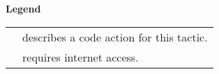 \documentclass[a4paper]{article}
\newcommand{\light}{\faLightbulbO\xspace}
\newcommand{\internet}{\faGlobe\xspace}
\begin{document}
\textbf{Legend}\\
\begin{tabular}{ll}
\light & describes a code action for this tactic.\\
\internet & requires internet access.\\
\end{tabular}
\bigskip

\end{document}
